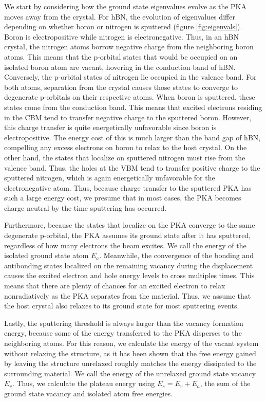 \documentclass[twoside,twocolumn,9pt]{article}
\begin{document}
We start by considering how the ground state eigenvalues evolve as the PKA
moves away from the crystal.  For hBN, the evolution of eigenvalues differ
depending on whether boron or nitrogen is sputtered (figure
\ref{fig:eigenvals}).  Boron is electropositive while nitrogen is
electronegative.  Thus, in an hBN crystal, the nitrogen atoms borrow negative
charge from the neighboring boron atoms.  This means that the p-orbital states
that would be occupied on an isolated boron atom are vacant, hovering in
the conduction band of hBN.  Conversely, the p-orbital states of nitrogen lie
occupied in the valence band.
For both atoms, separation from the crystal causes those states to converge to
degenerate p-orbitals on their respective atoms.
When boron is sputtered, these states come from the conduction band.
This means that excited electrons residing in the CBM tend to transfer
negative charge to the sputtered boron.  However, this charge transfer is quite
energetically unfavorable since boron is electropositive. The energy cost of
this is much larger than the band gap of hBN, compelling any excess electrons
on boron to relax to the host crystal. On the other hand, the states that
localize on sputtered nitrogen must rise from the valence band.
Thus, the holes at the VBM tend to transfer positive charge to the sputtered
nitrogen, which is again energetically unfavorable for the electronegative
atom.
Thus, because charge transfer to the sputtered PKA has such a large energy
cost, we presume that in most cases, the PKA becomes charge neutral by the time
sputtering has occurred.

Furthermore, because the states that localize on the PKA converge to the same
degenerate p-orbital, the PKA assumes its ground state after it has sputtered,
regardless of how many electrons the beam excites.
We call the energy of the isolated ground state atom $E_a$.
Meanwhile, the convergence of the bonding and antibonding states localized on
the remaining vacancy during the displacement causes the excited electron and
hole energy levels to cross multiples times.
This means that there are plenty of chances for an excited electron to relax
nonradiatively as the PKA separates from the material.
Thus, we assume that the host crystal also relaxes to its ground state for most
sputtering events.

Lastly, the sputtering threshold is always larger than the vacancy formation
energy, because some of the energy transferred to the PKA disperses to the
neighboring atoms.
For this reason, we calculate the energy of the vacant system without relaxing
the structure, as it has been shown that the free energy gained by leaving the
structure unrelaxed roughly matches the energy dissipated to the
surrounding material.\cite{Komsa2012}
We call the energy of the unrelaxed ground state vacancy $E_v$.
Thus, we calculate the plateau energy using $E_s = E_v + E_a$, the sum of the
ground state vacancy and isolated atom free energies.
\end{document}
